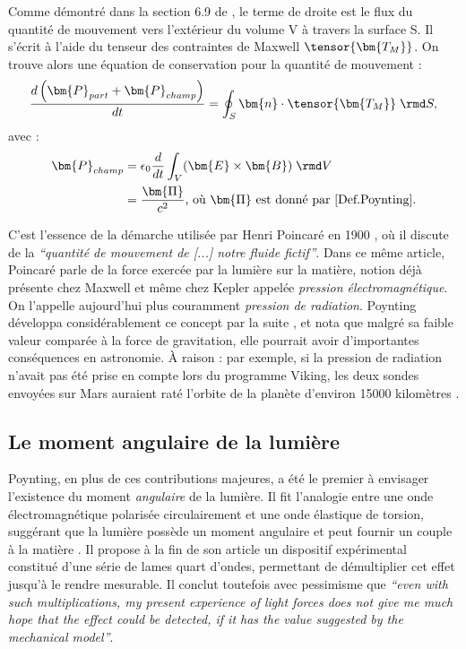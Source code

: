 Comme démontré dans la section 6.9 de , le terme de droite est le flux du quantité de mouvement vers l'extérieur du volume V à travers la surface S. Il s'écrit à l'aide du tenseur des contraintes de Maxwell $\tensor{\bm{T_M}}$. On trouve alors une équation de conservation pour la quantité de mouvement :
\[\frac{d\left(\bm{P}_{part}+\bm{P}_{champ}\right)}{dt} = \oint_S \bm{n}\cdot\tensor{\bm{T_M}}\;\rmd S,\]
avec :
\begin{align}
\bm{P}_{champ} &= \epsilon_0\frac{d}{dt}\int_V (\bm{E}\times\bm{B})\; \rmd V \nonumber\\
&= \frac{\bm{\Pi}}{c^2} \mbox{, où $\bm{\Pi}$ est donné par \ref{Def.Poynting}.}
\label{eq:defP}
\end{align}

C'est l'essence de la démarche utilisée par Henri Poincaré en 1900 , où il discute de la \textit{``quantité de mouvement de [...] notre fluide fictif''}. Dans ce même article, Poincaré parle de la force exercée par la lumière sur la matière, notion déjà présente chez Maxwell et même chez Kepler appelée \textit{pression électromagnétique}. On l'appelle aujourd'hui plus couramment \textit{pression de radiation}. Poynting développa considérablement ce concept par la suite , et nota que malgré sa faible valeur comparée à la force de gravitation, elle pourrait avoir d'importantes conséquences en astronomie. \`{A} raison : par exemple, si la pression de radiation n'avait pas été prise en compte lors du programme Viking, les deux sondes envoyées sur Mars auraient raté l'orbite de la planète d'environ 15000 kilomètres .

\subsection{Le moment angulaire de la lumière}
Poynting, en plus de ces contributions majeures, a été le premier à envisager l'existence du moment \textit{angulaire} de la lumière. Il fit l'analogie entre une onde électromagnétique polarisée circulairement et une onde élastique de torsion, suggérant que la lumière possède un moment angulaire et peut fournir un couple à la matière . Il propose à la fin de son article un dispositif expérimental constitué d'une série de lames quart d'ondes, permettant de démultiplier cet effet jusqu'à le rendre mesurable. Il conclut toutefois avec pessimisme que \textit{``even with such multiplications, my present experience of light forces does not give me much hope that the effect could be detected, if it has the value suggested by the mechanical model''}.


